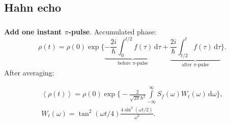 \documentclass[aspectratio=169, 13pt, t]{beamer}
\newcommand{\diff}{\,\mathrm{d}}
\begin{document}
\subsection{Hahn echo}
\begin{frame}[t]\frametitle{\secname}\framesubtitle{\subsecname}
\textbf{Add one instant $\pi$-pulse}. Accumulated phase:
\begin{equation*}
\rho(t) = \rho(0)\exp \Big\{ \underbrace{- \frac{2i}{\hbar}\int_0^{t/2} f(\tau)  \diff \tau}_{\text{before }\pi\text{-pulse}} + \underbrace{\frac{2i}{\hbar}\int_{t/2}^{t} f(\tau)  \diff \tau}_{\text{after }\pi\text{-pulse}} \Big	\}.
\end{equation*}
After averaging:
\begin{mybox}
\[
\begin{gathered}
\left<\rho(t)\right> = \rho(0)\exp \Big\{ - \frac{2}{\sqrt{2\pi} \hbar^2} \int\limits_{-\infty}^{\infty}  S_f(\omega) W_t (\omega)\diff \omega \Big\},\\
W_t (\omega) = \tan^2(\omega t/4)\frac{4 \sin^2(\omega t/2)}{\omega^2}.
\end{gathered}
\]
\end{mybox}
\end{frame}
\end{document}

